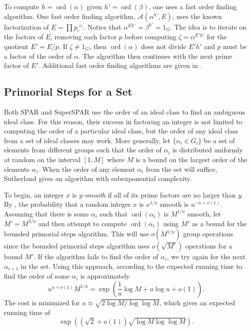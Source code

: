 \documentclass{ucalgthes1}
\theoremstyle{definition}
\DeclareMathOperator{\ord}{ord}
\begin{document}
To compute $h = \ord(\alpha)$ given $h' = \ord(\beta)$, one uses a fast order finding algorithm.  One fast order finding algorithm, $\mathcal A(\alpha^{h'}, E)$, uses the known factorization of $E=\prod {p_i}^{e_i}$.  Notice that $\alpha^{Eh'} = \beta^{h'} = 1_G$.  The idea is to iterate on the factors of $E$, removing each factor $p$ before computing $\zeta = \alpha^{E'h'}$ for the quotient $E' = E/p$. If $\zeta \neq 1_G$, then $\ord(\alpha)$ does not divide $E'h'$ and $p$ must be a factor of the order of $\alpha$.  The algorithm then continues with the next prime factor of $E'$.  Additional fast order finding algorithms are given in \mbox{\cite[Chapter~7]{Sutherland2007}}.

\subsection{Primorial Steps for a Set}
\label{subsec:primorialStepsForASet}

Both SPAR and SuperSPAR use the order of an ideal class to find an ambiguous ideal class.  For this reason, their success in factoring an integer is not limited to computing the order of a particular ideal class, but the order of any ideal class from a set of ideal classes may work.  More generally, let $\{ \alpha_i \in G_i \}$ be a set of elements from different groups such that the order of $\alpha_i$ is distributed uniformly at random on the interval $[1, M]$ where $M$ is a bound on the largest order of the elements $\alpha_i$.  When the order of any element $\alpha_i$ from the set will suffice, Sutherland \cite[\S 5.4]{Sutherland2007} gives an algorithm with subexponential complexity.

To begin, an integer $x$ is \emph{$y$-smooth} if all of its prime factors are no larger than $y$.  By \cite[p.81]{Sutherland2007}, the probability that a random integer $x$ is $x^{1/u}$ smooth is $u^{-u+o(1)}$.  Assuming that there is some $\alpha_i$ such that $\ord(\alpha_i)$ is $M^{1/u}$ smooth, let $M'=M^{2/u}$ and then attempt to compute $\ord(\alpha_i)$ using $M'$ as a bound for the bounded primorial steps algorithm.  This will use $o(M^{1/u})$ group operations since the bounded primorial steps algorithm uses $o(\sqrt{M'})$ operations for a bound $M'$.  If the algorithm fails to find the order of $\alpha_i$, we try again for the next $\alpha_{i+1}$ in the set.  Using this approach, according to \cite[pp.81--82]{Sutherland2007} the expected running time to find the order of some $\alpha_i$ is approximately
\[
	u^{u+o(1)}M^{1/u} = \exp \left( \frac{1}{u}\log M + u \log u + o(1) \right).
\]
The cost is minimized for $u \approx \sqrt{2 \log M / \log \log M}$, which gives an expected running time of
\[
	\exp \left( \left( \sqrt2 + o(1) \right) \sqrt{\log M \log \log M} \right).
\]
\end{document}
